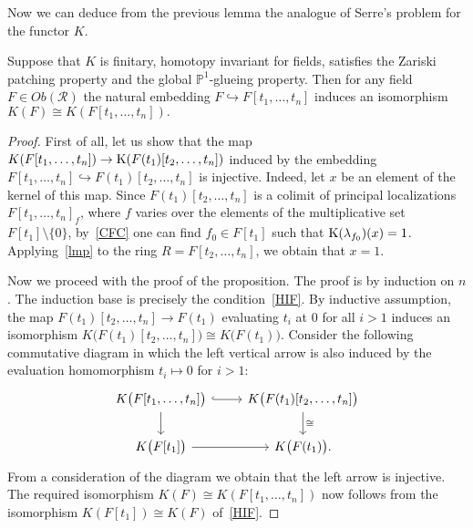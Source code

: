\documentclass[oneside, 11pt]{amsart} \pdfoutput=1
\begin{document}
Now we can deduce from the previous lemma the analogue of Serre's problem for the functor $K$.
\begin{prop} \label{asp}
Suppose that $K$ is finitary, homotopy invariant for fields, satisfies the Zariski patching property and the global $\mathbb{P}^1$-glueing property. Then for any field $F\in Ob(\mathcal{R})$ the natural embedding $F\hookrightarrow F[t_1,\ldots,t_n]$ induces an isomorphism
$K(F)\cong K(F[t_1,\ldots,t_n]).$ \end{prop}
\begin{proof} First of all, let us show that the map $K(F[t_1,\ldots,t_n])\to {\mathrm{K}}(F(t_1)[t_2,\ldots,t_n])$ induced by the embedding $F[t_1,\ldots,t_n] \hookrightarrow F(t_1)[t_2,\ldots,t_n]$ is injective.
Indeed, let $x$ be an element of the kernel of this map. Since $F(t_1)[t_2,\ldots,t_n]$ is a colimit of principal localizations $F[t_1,\ldots,t_n]_f$, where $f$ varies over the elements of the multiplicative set $F[t_1] \setminus \{0\}$, by~\ref{CFC} one can find $f_0\in F[t_1]$ such that ${\mathrm{K}}(\lambda_{f_0})(x)=1$. Applying~\cref{lmp} to the ring $R=F[t_2,\ldots,t_n]$, we obtain that $x=1$. 

Now we proceed with the proof of the proposition. The proof is by induction on $n$. The induction base is precisely the condition~\ref{HIF}. By inductive assumption, the map $F(t_1)[t_2,\ldots,t_n]\rightarrow F(t_1)$ evaluating $t_i$ at $0$ for all $i>1$ induces an isomorphism $K\big(F(t_1)[t_2,\ldots,t_n]\big)\cong K\big(F(t_1)\big)$. Consider the following commutative diagram in which the left vertical arrow is also induced by the evaluation homomorphism $t_i \mapsto 0$ for $i > 1$:
$$\begin{tikzcd}
K\bigl(F[t_1, \ldots, t_n]\bigr) \ar[hookrightarrow]{r} \ar{d} & K\bigl(F(t_1)[t_2, \ldots, t_n]\bigr) \ar{d}{\cong}\\
K\bigl(F[t_1]\bigr) \ar{r} & K\bigl(F(t_1)\bigr).
\end{tikzcd}$$
From a consideration of the diagram we obtain that the left arrow is injective. The required isomorphism $K(F) \cong K(F[t_1, \ldots, t_n])$ now follows from the isomorphism $K(F[t_1]) \cong K(F)$ of~\ref{HIF}. \end{proof}
\end{document}
